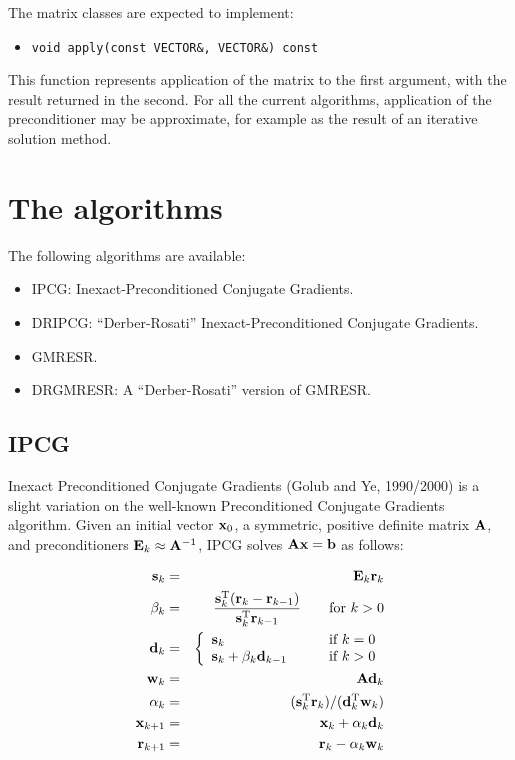 \documentclass[12pt]{article}
\newcommand{\vect}[1]{{\bf #1}}                         %
\newcommand{\mat}[1]{{\bf #1}}                          %
\newcommand{\rmT}{{\rm T}}                           %
\begin{document}
The matrix classes are expected to implement:
\begin{itemize}
\item {\tt void apply(const VECTOR\&, VECTOR\&) const}
\end{itemize}
This function represents application of the matrix to the first
argument, with the result returned in the second. For all the current
algorithms, application of the preconditioner may be approximate, for
example as the result of an iterative solution method.

\section{The algorithms}

The following algorithms are available:
\begin{itemize}
\item IPCG: Inexact-Preconditioned Conjugate Gradients.
\item DRIPCG: ``Derber-Rosati'' Inexact-Preconditioned Conjugate Gradients.
\item GMRESR.
\item DRGMRESR: A ``Derber-Rosati'' version of GMRESR.
\end{itemize}

\subsection{IPCG}

Inexact Preconditioned Conjugate Gradients (Golub and Ye, 1990/2000) is a
slight variation on the well-known Preconditioned Conjugate Gradients
algorithm. Given an initial vector $\vect{x}_0$, a symmetric, positive definite
matrix $\mat{A}$, and preconditioners $\mat{E}_k \approx \mat{A}^{-1}$,
IPCG solves $\mat{A}\vect{x} = \vect{b}$ as follows:
\begin{center}
\begin{minipage}{0.8\textwidth}
\begin{eqnarray}
  \label{IPCG-precond-eqn}
  \vect{s}_k &=& \mat{E}_k \vect{r}_k \\
  \beta_k &=& 
           \frac{ \vect{s}_k^\rmT (\vect{r}_k -\vect{r}_{k-1})}
                { \vect{s}_k^\rmT \vect{r}_{k-1} }
                                   \qquad\mbox{for $k>0$} \\
  \vect{d}_k &=& \left\{
       \begin{array}{ll}
           \vect{s}_k & \qquad\mbox{if $k=0$} \\
           \vect{s}_k + \beta_k \vect{d}_{k-1}
                                   & \qquad\mbox{if $k>0$}
       \end{array} \right. \\
  \vect{w}_k &=& \mat{A} \vect{d}_k \\
  \alpha_k &=& (\vect{s}_k^\rmT \vect{r}_k )/(\vect{d}_k^\rmT \vect{w}_k )\\
  \vect{x}_{k+1} &=& \vect{x}_k + \alpha_k \vect{d}_k \\
  \vect{r}_{k+1} &=& \vect{r}_k - \alpha_k \vect{w}_k
\end{eqnarray}
\end{minipage}
\end{center}
\end{document}
